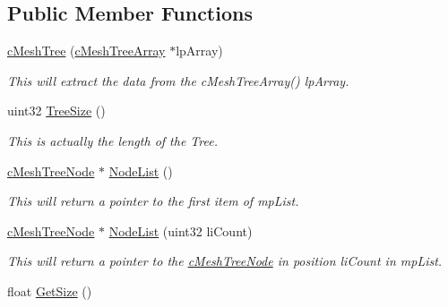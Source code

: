 \subsection*{Public Member Functions}
\begin{DoxyCompactItemize}
\item 
\hypertarget{classc_mesh_tree_a5847e3ca4f4f2531c6b0df1cd2c7a783}{
\hyperlink{classc_mesh_tree_a5847e3ca4f4f2531c6b0df1cd2c7a783}{cMeshTree} (\hyperlink{classc_mesh_tree_array}{cMeshTreeArray} $\ast$lpArray)}
\label{classc_mesh_tree_a5847e3ca4f4f2531c6b0df1cd2c7a783}

\begin{DoxyCompactList}\small\item\em This will extract the data from the cMeshTreeArray() lpArray. \end{DoxyCompactList}\item 
\hypertarget{classc_mesh_tree_af3667772e99dbbff048fc5189af7cf07}{
uint32 \hyperlink{classc_mesh_tree_af3667772e99dbbff048fc5189af7cf07}{TreeSize} ()}
\label{classc_mesh_tree_af3667772e99dbbff048fc5189af7cf07}

\begin{DoxyCompactList}\small\item\em This is actually the length of the Tree. \end{DoxyCompactList}\item 
\hypertarget{classc_mesh_tree_a2af67ab77feaed272985daf8b74ed662}{
\hyperlink{classc_mesh_tree_node}{cMeshTreeNode} $\ast$ \hyperlink{classc_mesh_tree_a2af67ab77feaed272985daf8b74ed662}{NodeList} ()}
\label{classc_mesh_tree_a2af67ab77feaed272985daf8b74ed662}

\begin{DoxyCompactList}\small\item\em This will return a pointer to the first item of mpList. \end{DoxyCompactList}\item 
\hypertarget{classc_mesh_tree_ae7545034b95adcf5e2f77fb009ffd803}{
\hyperlink{classc_mesh_tree_node}{cMeshTreeNode} $\ast$ \hyperlink{classc_mesh_tree_ae7545034b95adcf5e2f77fb009ffd803}{NodeList} (uint32 liCount)}
\label{classc_mesh_tree_ae7545034b95adcf5e2f77fb009ffd803}

\begin{DoxyCompactList}\small\item\em This will return a pointer to the \hyperlink{classc_mesh_tree_node}{cMeshTreeNode} in position liCount in mpList. \end{DoxyCompactList}\item 
\hypertarget{classc_mesh_tree_a3c82682fe2453aed6c5cdcf0316894bd}{
float \hyperlink{classc_mesh_tree_a3c82682fe2453aed6c5cdcf0316894bd}{GetSize} ()}
\label{classc_mesh_tree_a3c82682fe2453aed6c5cdcf0316894bd}


\end{DoxyCompactItemize}
